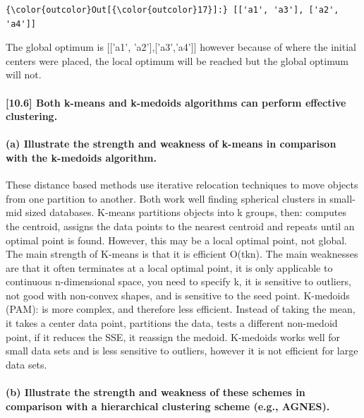 \documentclass[11pt]{article}
\begin{document}
\begin{Verbatim}[commandchars=\\\{\}]
{\color{outcolor}Out[{\color{outcolor}17}]:} [['a1', 'a3'], ['a2', 'a4']]
\end{Verbatim}
            
    The global optimum is {[}{[}'a1', 'a2'{]},{[}'a3','a4'{]}{]} however
because of where the initial centers were placed, the local optimum will
be reached but the global optimum will not.

    \paragraph{{[}10.6{]} Both k-means and k-medoids algorithms can perform
effective
clustering.}\label{both-k-means-and-k-medoids-algorithms-can-perform-effective-clustering.}

    \paragraph{(a) Illustrate the strength and weakness of k-means in
comparison with the k-medoids
algorithm.}\label{a-illustrate-the-strength-and-weakness-of-k-means-in-comparison-with-the-k-medoids-algorithm.}

    These distance based methods use iterative relocation techniques to move
objects from one partition to another. Both work well finding spherical
clusters in small-mid sized databases. K-means partitions objects into k
groups, then: computes the centroid, assigns the data points to the
nearest centroid and repeats until an optimal point is found. However,
this may be a local optimal point, not global. The main strength of
K-means is that it is efficient O(tkn). The main weaknesses are that it
often terminates at a local optimal point, it is only applicable to
continuous n-dimensional space, you need to specify k, it is sensitive
to outliers, not good with non-convex shapes, and is sensitive to the
seed point. K-medoids (PAM): is more complex, and therefore less
efficient. Instead of taking the mean, it takes a center data point,
partitions the data, tests a different non-medoid point, if it reduces
the SSE, it reassign the medoid. K-medoids works well for small data
sets and is less sensitive to outliers, however it is not efficient for
large data sets.

    \paragraph{(b) Illustrate the strength and weakness of these schemes in
comparison with a hierarchical clustering scheme (e.g.,
AGNES).}\label{b-illustrate-the-strength-and-weakness-of-these-schemes-in-comparison-with-a-hierarchical-clustering-scheme-e.g.-agnes.}
\end{document}
